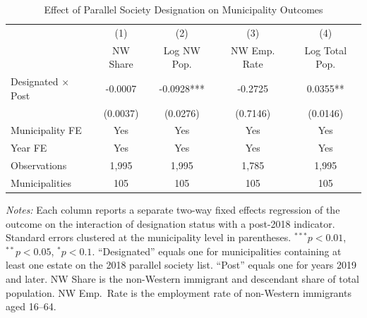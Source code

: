 \begin{table}[htbp]
\centering
\caption{Effect of Parallel Society Designation on Municipality Outcomes}
\label{tab:main}
\begin{tabular}{lcccc}
\hline\hline
 & (1) & (2) & (3) & (4) \\
 & NW Share & Log NW Pop. & NW Emp. Rate & Log Total Pop. \\
\hline
Designated $\times$ Post & -0.0007 & -0.0928*** & -0.2725 & 0.0355** \\
 & (0.0037) & (0.0276) & (0.7146) & (0.0146) \\
\hline
Municipality FE & Yes & Yes & Yes & Yes \\
Year FE & Yes & Yes & Yes & Yes \\
Observations & 1,995 & 1,995 & 1,785 & 1,995 \\
Municipalities & 105 & 105 & 105 & 105 \\
\hline\hline
\end{tabular}
\begin{tablenotes}[flushleft]
\small
\item \textit{Notes:} Each column reports a separate two-way fixed effects regression of the outcome on the interaction of designation status with a post-2018 indicator. Standard errors clustered at the municipality level in parentheses. $^{***}p<0.01$, $^{**}p<0.05$, $^{*}p<0.1$. ``Designated'' equals one for municipalities containing at least one estate on the 2018 parallel society list. ``Post'' equals one for years 2019 and later. NW Share is the non-Western immigrant and descendant share of total population. NW Emp.~Rate is the employment rate of non-Western immigrants aged 16--64.
\end{tablenotes}
\end{table}
